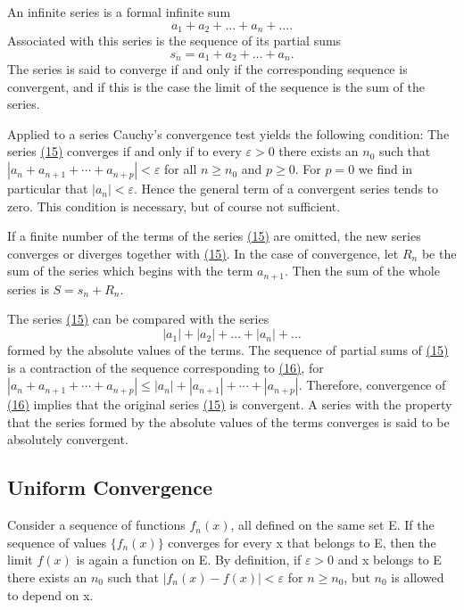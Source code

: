 An infinite series is a formal infinite sum
\begin{equation*}
a _ {1} + a _ {2} + \dots + a _ {n} + \dots .\tag{15}\label{eq:2.15}
\end{equation*}
Associated with this series is the sequence of its partial sums
\begin{equation*}
s _ {n} = a _ {1} + a _ {2} + \dots + a _ {n}.
\end{equation*}
The series is said to converge if and only if the corresponding sequence is convergent, and if this is the case the limit of the sequence is the sum of the series.

Applied to a series Cauchy's convergence test yields the following condition: The series \hyperref[eq:2.15]{(15)} converges if and only if to every $\varepsilon > 0$ there exists an $n_0$ such that $|a_n + a_{n+1} + \cdots + a_{n+p}| < \varepsilon$ for all $n \geq n_0$ and $p \geq 0$. For $p = 0$ we find in particular that $|a_n| < \varepsilon$. Hence the general term of a convergent series tends to zero. This condition is necessary, but of course not sufficient.

If a finite number of the terms of the series \hyperref[eq:2.15]{(15)} are omitted, the new series converges or diverges together with \hyperref[eq:2.15]{(15)}. In the case of convergence, let $R_{n}$ be the sum of the series which begins with the term $a_{n+1}$. Then the sum of the whole series is $S = s_{n} + R_{n}$.

The series \hyperref[eq:2.15]{(15)} can be compared with the series
\begin{equation*}
\left| a _ {1} \right| + \left| a _ {2} \right| + \dots + \left| a _ {n} \right| + \dots\tag{16}\label{eq:2.16}
\end{equation*}
formed by the absolute values of the terms. The sequence of partial sums of \hyperref[eq:2.15]{(15)} is a contraction of the sequence corresponding to \hyperref[eq:2.16]{(16)}, for $|a_{n} + a_{n+1} + \cdots + a_{n+p}| \leq |a_{n}| + |a_{n+1}| + \cdots + |a_{n+p}|$. Therefore, convergence of \hyperref[eq:2.16]{(16)} implies that the original series \hyperref[eq:2.15]{(15)} is convergent. A series with the property that the series formed by the absolute values of the terms converges is said to be absolutely convergent.

\setcounter{section}{2}\setcounter{subsection}{2}\subsection{Uniform Convergence}\label{sec:2.2.3}
Consider a sequence of functions $f_{n}(x)$, all defined on the same set E. If the sequence of values $\{f_{n}(x)\}$ converges for every x that belongs to E, then the limit $f(x)$ is again a function on E. By definition, if $\varepsilon > 0$ and x belongs to E there exists an $n_{0}$ such that $|f_{n}(x) - f(x)| < \varepsilon$ for $n \geq n_{0}$, but $n_{0}$ is allowed to depend on x.


